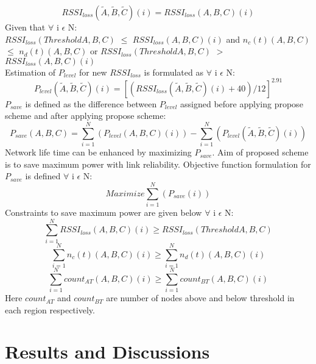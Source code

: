 \documentclass[12pt, conference, compsocconf, onecolumn, draftcls]{IEEEtran}
\begin{document}
\begin{equation}
RSSI_{loss}(\tilde {A}, \tilde {B}, \tilde {C})(i)=RSSI_{loss}(A, B, C)(i)
\end{equation}
Given that $\forall$ i $\epsilon$ N:\\
$RSSI_{loss}(Threshold A, B, C)$ $\leq$ $RSSI_{loss}(A, B, C)(i)$ and $n_{c}(t)(A, B, C)$ $\leq$ $n_{d}(t)(A, B, C)$ or $RSSI_{loss}(Threshold A, B, C)$ $>$ $RSSI_{loss}(A, B, C)(i)$\\
Estimation of $P_{level}$ for new $RSSI_{loss}$ is formulated as $\forall$ i $\epsilon$ N:\\
\begin{equation}
P_{level}(\tilde {A}, \tilde {B}, \tilde {C})(i)=[(RSSI_{loss}(\tilde {A}, \tilde {B}, \tilde {C})(i)+40)/12]^{2.91}
\end{equation}
$P_{save}$ is defined as the difference between $P_{level}$ assigned before applying propose scheme and after applying propose scheme:\\
\begin{equation}
P_{save}(A, B, C)=\sum_{i=1}^{N} (P_{level}(A, B, C)(i))- \sum_{i=1}^{N} (P_{level}(\tilde {A}, \tilde {B}, \tilde {C})(i))
\end{equation}
Network life time can be enhanced by maximizing $P_{save}$. Aim of proposed scheme is to save maximum power with link reliability. Objective  function formulation for $P_{save}$ is defined $\forall$ i $\epsilon$ N:\\
\begin{equation}
Maximize   \sum_{i=1}^{N} (P_{save}(i))
\end{equation}
Constraints to save maximum power are given below $\forall$ i $\epsilon$ N:\\
\begin{equation}
  \sum_{i=1}^{N} RSSI_{loss}(A, B, C)(i)\geq  RSSI_{loss}(Threshold A, B, C)
\end{equation}
\begin{equation}
  \sum_{i=1}^{N} n_{c}(t)(A, B, C)(i)\geq \sum_{i=1}^{N} n_{d}(t)(A, B, C)(i)
\end{equation}
\begin{equation}
  \sum_{i=1}^{N} count_{AT}(A, B, C)(i)\geq \sum_{i=1}^{N} count_{BT}(A, B, C)(i)
\end{equation}
Here $count_{AT}$ and $count_{BT}$ are number of nodes above and below threshold in each region respectively.

\section{Results and Discussions}
\end{document}

